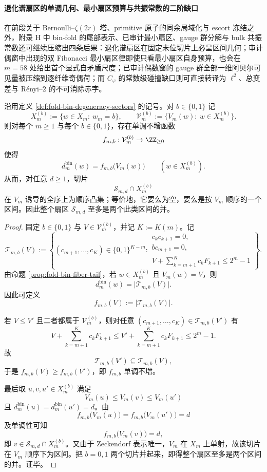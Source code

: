 \paragraph{退化谱扇区的单调几何、最小扇区预算与共振常数的二阶缺口}
在前段关于 Bernoulli--\(\zeta(2r)\) 塔、primitive 原子的同余局域化与 escort 冻结之外，附录 H 中 bin-fold 的尾部表示、已审计最小扇区、gauge 群分解与 bulk 共振常数还可继续压缩出四条后果：退化谱扇区在固定末位切片上必呈区间几何；审计偶窗中出现的双 Fibonacci 最小扇区律即使只看最小扇区自身预算，也会在 \(m=58\) 处给出首个显式自矛盾尺度；已审计偶数窗的 gauge 群全部一维阿贝尔可见量被压缩到逐纤维奇偶荷；而 \(C_\varphi\) 的常数级碰撞缺口则可直接转译为 \(\ell^2\)、总变差与 Rényi--\(2\) 的不可消除赤字。

\begin{theorem}\label{thm:gut-foldbin-degeneracy-sector-lastbit-interval}
沿用定义 \ref{def:fold-bin-degeneracy-sectors} 的记号。对 \(b\in\{0,1\}\) 记
\[
X_m^{(b)}:=\{w\in X_m:\ w_m=b\},
\qquad
\mathcal V_m^{(b)}:=\{V_m(w):\ w\in X_m^{(b)}\}.
\]
则对每个 \(m\ge 1\) 与每个 \(b\in\{0,1\}\)，存在单调不增函数
\[
f_{m,b}:\mathcal V_m^{(b)}\to \ZZ_{\ge 0}
\]
使得
\[
d_m^{\mathrm{bin}}(w)=f_{m,b}\!\bigl(V_m(w)\bigr)
\qquad (w\in X_m^{(b)}).
\]
从而，对任意 \(d\ge 1\)，切片
\[
\mathcal S_{m,d}\cap X_m^{(b)}
\]
在 \(V_m\) 诱导的全序上为顺序凸集；等价地，它要么为空，要么是按 \(V_m\) 顺序的一个区间。因此整个扇区 \(\mathcal S_{m,d}\) 至多是两个此类区间的并。
\end{theorem}
\begin{proof}
固定 \(b\in\{0,1\}\) 与 \(V\in\mathcal V_m^{(b)}\)，并记 \(K:=K(m)\)。记
\[
\mathcal T_{m,b}(V)
:=
\left\{
(c_{m+1},\dots,c_K)\in\{0,1\}^{K-m}:
\begin{array}{l}
c_kc_{k+1}=0,\\
bc_{m+1}=0,\\
V+\sum_{k=m+1}^{K}c_kF_{k+1}\le 2^m-1
\end{array}
\right\}.
\]
由命题 \ref{prop:fold-bin-fiber-tail}，若 \(w\in X_m^{(b)}\) 且 \(V_m(w)=V\)，则
\[
d_m^{\mathrm{bin}}(w)=\bigl|\mathcal T_{m,b}(V)\bigr|.
\]
因此可定义
\[
f_{m,b}(V):=\bigl|\mathcal T_{m,b}(V)\bigr|.
\]

若 \(V\le V'\) 且二者都属于 \(\mathcal V_m^{(b)}\)，则对任意
\((c_{m+1},\dots,c_K)\in \mathcal T_{m,b}(V')\) 有
\[
V+\sum_{k=m+1}^{K}c_kF_{k+1}
\le
V'+\sum_{k=m+1}^{K}c_kF_{k+1}
\le 2^m-1.
\]
故
\[
\mathcal T_{m,b}(V')\subseteq \mathcal T_{m,b}(V),
\]
于是 \(f_{m,b}(V)\ge f_{m,b}(V')\)，即 \(f_{m,b}\) 单调不增。

最后取 \(u,v,u'\in X_m^{(b)}\) 满足
\[
V_m(u)\le V_m(v)\le V_m(u')
\]
且 \(d_m^{\mathrm{bin}}(u)=d_m^{\mathrm{bin}}(u')=d\)。由
\[
f_{m,b}\!\bigl(V_m(u)\bigr)=f_{m,b}\!\bigl(V_m(u')\bigr)=d
\]
及单调性可知
\[
f_{m,b}\!\bigl(V_m(v)\bigr)=d,
\]
即 \(v\in \mathcal S_{m,d}\cap X_m^{(b)}\)。又由于 Zeckendorf 表示唯一，\(V_m\) 在 \(X_m\) 上单射，故该切片在 \(V_m\) 顺序下为区间。把 \(b=0,1\) 两个切片并起来，即得整个扇区至多是两个区间的并。证毕。
\end{proof}

